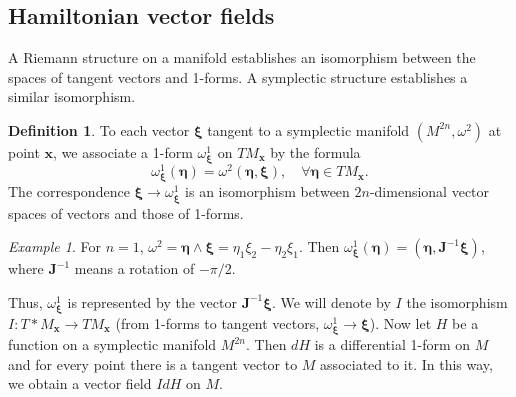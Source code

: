 \documentclass{book}
\numberwithin{equation}{section}
\theoremstyle{plain}
\theoremstyle{definition}
\newtheorem*{defn*}{Definition}
\theoremstyle{remark}
\theoremstyle{remark}
\newtheorem*{ex*}{Example}
\begin{document}
\subsection{Hamiltonian vector fields}



A Riemann structure on a manifold establishes an isomorphism between
the spaces of tangent vectors and 1-forms.
%
A symplectic structure establishes a similar isomorphism.


\begin{defn*}
%
To each vector $\pmb \xi$
tangent to a symplectic manifold $(M^{2n}, \omega^2)$
at point $\mathbf x$, we associate a 1-form $\omega^1_{\pmb \xi}$
on $TM_{\mathbf x}$ by the formula
$$
\omega^1_{\pmb \xi}(\pmb \eta) = \omega^2(\pmb \eta, \pmb \xi),
\quad \forall \pmb \eta \in TM_{\mathbf x}.
$$
%
The correspondence $\pmb \xi \rightarrow \omega^1_{\mathbf \xi}$
is an isomorphism between $2n$-dimensional vector spaces of vectors
and those of 1-forms.
\end{defn*}


\begin{ex*}
%
For $n = 1$,
$\omega^2 = \pmb \eta \wedge \pmb \xi = \eta_1 \xi_2 - \eta_2 \xi_1$.
Then
$\omega^1_{\pmb \xi}(\pmb \eta) = (\pmb \eta, \mathbf J^{-1} \pmb \xi)$,
where $\mathbf J^{-1}$ means a rotation of $-\pi/2$.
\end{ex*}

Thus, $\omega^1_{\pmb \xi}$ is represented by the vector $\mathbf J^{-1} \pmb \xi$.
%
We will denote by $I$ the isomorphism
$I: T*M_{\mathbf x} \rightarrow TM_{\mathbf x}$
(from 1-forms to tangent vectors,
$\omega^1_{\pmb \xi} \rightarrow \pmb \xi$).
%
Now let $H$ be a function on a symplectic manifold $M^{2n}$.
%
Then $dH$ is a differential 1-form on $M$ and
for every point there is a tangent vector to $M$ associated to it.
%
In this way, we obtain a vector field $IdH$ on $M$.
\end{document}

